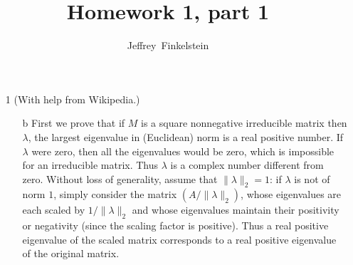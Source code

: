 \documentclass{article}
\author{Jeffrey~Finkelstein}
\title{Homework 1, part 1}
\newcommand{\1}{\mathbf{1}}
\newcommand{\0}{\mathbf{0}}
\begin{document}
\maketitle

\begin{enumerate}

\item[1]
  (With help from Wikipedia.)

  \begin{enumerate}
  \item[b]
    First we prove that if $M$ is a square nonnegative irreducible matrix then $\lambda$, the largest eigenvalue in (Euclidean) norm is a real positive number.
    If $\lambda$ were zero, then all the eigenvalues would be zero, which is impossible for an irreducible matrix.
    Thus $\lambda$ is a complex number different from zero.
    Without loss of generality, assume that $\|\lambda\|_2 = 1$: if $\lambda$ is not of norm $1$, simply consider the matrix $(A / \|\lambda\|_2)$, whose eigenvalues are each scaled by $1 / \|\lambda\|_2$ and whose eigenvalues maintain their positivity or negativity (since the scaling factor is positive).
    Thus a real positive eigenvalue of the scaled matrix corresponds to a real positive eigenvalue of the original matrix.


\end{enumerate}
\end{enumerate}
\end{document}
